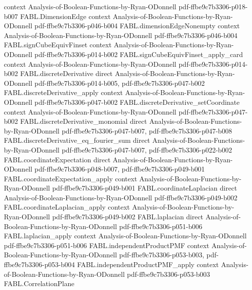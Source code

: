 \begin{theorem}
  {context}
  {Analysis-of-Boolean-Functions-by-Ryan-ODonnell}
  {pdf-ffbe9c7b3306-p018-b007}
\proofstep
  {FABL.DimensionEdge}
  {context}
  {Analysis-of-Boolean-Functions-by-Ryan-ODonnell}
  {pdf-ffbe9c7b3306-p046-b004}
\proofstep
  {FABL.dimensionEdgeNonempty}
  {context}
  {Analysis-of-Boolean-Functions-by-Ryan-ODonnell}
  {pdf-ffbe9c7b3306-p046-b004}
\proofstep
  {FABL.signCubeEquivFinset}
  {context}
  {Analysis-of-Boolean-Functions-by-Ryan-ODonnell}
  {pdf-ffbe9c7b3306-p014-b002}
\proofstep
  {FABL.signCubeEquivFinset_apply_card}
  {context}
  {Analysis-of-Boolean-Functions-by-Ryan-ODonnell}
  {pdf-ffbe9c7b3306-p014-b002}
\proofstep
  {FABL.discreteDerivative}
  {direct}
  {Analysis-of-Boolean-Functions-by-Ryan-ODonnell}
  {pdf-ffbe9c7b3306-p014-b005,
    pdf-ffbe9c7b3306-p047-b002}
\proofstep
  {FABL.discreteDerivative_apply}
  {context}
  {Analysis-of-Boolean-Functions-by-Ryan-ODonnell}
  {pdf-ffbe9c7b3306-p047-b002}
\proofstep
  {FABL.discreteDerivative_setCoordinate}
  {context}
  {Analysis-of-Boolean-Functions-by-Ryan-ODonnell}
  {pdf-ffbe9c7b3306-p047-b002}
\proofstep
  {FABL.discreteDerivative_monomial}
  {direct}
  {Analysis-of-Boolean-Functions-by-Ryan-ODonnell}
  {pdf-ffbe9c7b3306-p047-b007,
    pdf-ffbe9c7b3306-p047-b008}
\proofstep
  {FABL.discreteDerivative_eq_fourier_sum}
  {direct}
  {Analysis-of-Boolean-Functions-by-Ryan-ODonnell}
  {pdf-ffbe9c7b3306-p047-b007,
    pdf-ffbe9c7b3306-p022-b002}
\proofstep
  {FABL.coordinateExpectation}
  {direct}
  {Analysis-of-Boolean-Functions-by-Ryan-ODonnell}
  {pdf-ffbe9c7b3306-p048-b007,
    pdf-ffbe9c7b3306-p049-b001}
\proofstep
  {FABL.coordinateExpectation_apply}
  {context}
  {Analysis-of-Boolean-Functions-by-Ryan-ODonnell}
  {pdf-ffbe9c7b3306-p049-b001}
\proofstep
  {FABL.coordinateLaplacian}
  {direct}
  {Analysis-of-Boolean-Functions-by-Ryan-ODonnell}
  {pdf-ffbe9c7b3306-p049-b002}
\proofstep
  {FABL.coordinateLaplacian_apply}
  {context}
  {Analysis-of-Boolean-Functions-by-Ryan-ODonnell}
  {pdf-ffbe9c7b3306-p049-b002}
\proofstep
  {FABL.laplacian}
  {direct}
  {Analysis-of-Boolean-Functions-by-Ryan-ODonnell}
  {pdf-ffbe9c7b3306-p051-b006}
\proofstep
  {FABL.laplacian_apply}
  {context}
  {Analysis-of-Boolean-Functions-by-Ryan-ODonnell}
  {pdf-ffbe9c7b3306-p051-b006}
\proofstep
  {FABL.independentProductPMF}
  {context}
  {Analysis-of-Boolean-Functions-by-Ryan-ODonnell}
  {pdf-ffbe9c7b3306-p053-b003,
    pdf-ffbe9c7b3306-p053-b004}
\proofstep
  {FABL.independentProductPMF_apply}
  {context}
  {Analysis-of-Boolean-Functions-by-Ryan-ODonnell}
  {pdf-ffbe9c7b3306-p053-b003}
\proofstep
  {FABL.CorrelationPlane}

\end{theorem}
